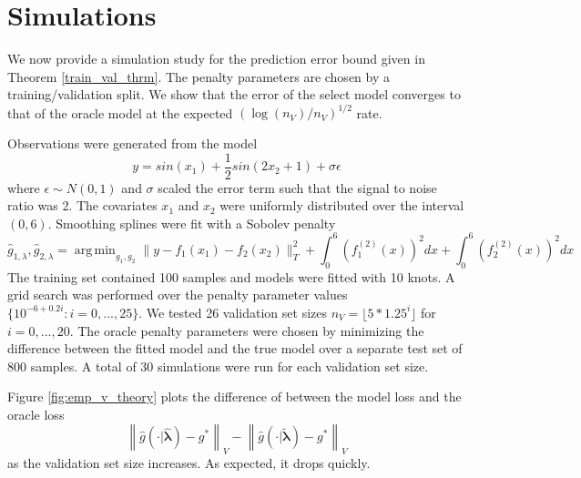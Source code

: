 \documentclass[12pt]{article}
\DeclareMathOperator*{\argmin}{arg\,min}
\begin{document}
\section{Simulations}\label{sec:simulations}

We now provide a simulation study for the prediction error bound given in Theorem \ref{train_val_thrm}. The penalty parameters are chosen by a training/validation split. We show that the error of the select model converges to that of the oracle model at the expected $(\log(n_V)/n_V)^{1/2}$ rate.

Observations were generated from the model
\begin{equation}
y = sin(x_1) + \frac{1}{2} sin(2 x_2 + 1) + \sigma \epsilon
\end{equation}
where $\epsilon \sim N(0,1)$ and $\sigma$ scaled the error term such that the signal to noise ratio was 2.
The covariates $x_1$ and $x_2$ were uniformly distributed over the interval $(0,6)$.
Smoothing splines were fit with a Sobolev penalty
\begin{equation}
\hat{g}_{1, \lambda}, \hat{g}_{2, \lambda} = \argmin_{g_1, g_2} \| y - f_1(x_1) - f_2(x_2) \|_T^2 + \int_0^6 (f_1^{(2)}(x))^2 dx + \int_0^6 (f_2^{(2)}(x))^2 dx
\end{equation}
The training set contained 100 samples and models were fitted with 10 knots. A grid search was performed over the penalty parameter values $\{10^{-6 + 0.2i}: i = 0, ..., 25 \}$. We tested 26 validation set sizes $n_V = \lfloor 5 * 1.25^{i} \rfloor $ for $i = 0, ..., 20$. The oracle penalty parameters were chosen by minimizing the difference between the fitted model and the true model over a separate test set of 800 samples. A total of 30 simulations were run for each validation set size.

Figure \ref{fig:emp_v_theory} plots the difference of between the model loss and the oracle loss
$$
\left \| \hat{g}(\cdot | \hat{\boldsymbol{\lambda}}) - g^* \right \|_V - 
\left \| \hat{g}(\cdot | \tilde{\boldsymbol{\lambda}}) - g^* \right \|_V
$$
as the validation set size increases. As expected, it drops quickly.
\end{document}
